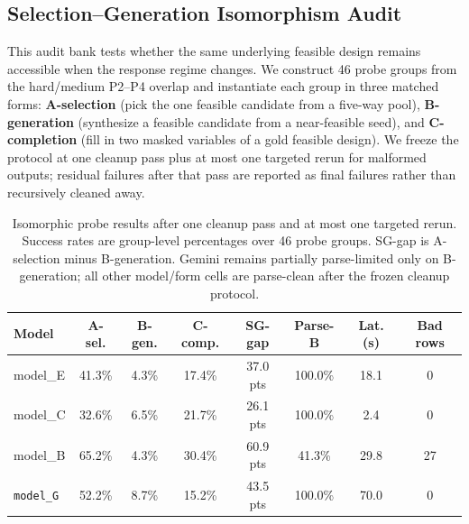 \subsection{Selection--Generation Isomorphism Audit}

This audit bank tests whether the same underlying feasible design remains accessible when the response regime changes. We construct 46 probe groups from the hard/medium P2--P4 overlap and instantiate each group in three matched forms: \textbf{A-selection} (pick the one feasible candidate from a five-way pool), \textbf{B-generation} (synthesize a feasible candidate from a near-feasible seed), and \textbf{C-completion} (fill in two masked variables of a gold feasible design). We freeze the protocol at one cleanup pass plus at most one targeted rerun for malformed outputs; residual failures after that pass are reported as final failures rather than recursively cleaned away.

\begin{table}[t]
\caption{Isomorphic probe results after one cleanup pass and at most one targeted rerun. Success rates are group-level percentages over 46 probe groups. SG-gap is A-selection minus B-generation. Gemini remains partially parse-limited only on B-generation; all other model/form cells are parse-clean after the frozen cleanup protocol.}
\label{tab:appendix_isomorphic_probe}
\centering
\scriptsize
\setlength{\tabcolsep}{3pt}
\renewcommand{\arraystretch}{1.08}
\begin{tabular}{p{30mm}ccccccc}
\toprule
Model & A-sel. & B-gen. & C-comp. & SG-gap & Parse-B & Lat. (s) & Bad rows \\
\midrule
model_E & 41.3\% & 4.3\% & 17.4\% & 37.0 pts & 100.0\% & 18.1 & 0 \\
model_C & 32.6\% & 6.5\% & 21.7\% & 26.1 pts & 100.0\% & 2.4 & 0 \\
model_B & 65.2\% & 4.3\% & 30.4\% & 60.9 pts & 41.3\% & 29.8 & 27 \\
\texttt{model_G} & 52.2\% & 8.7\% & 15.2\% & 43.5 pts & 100.0\% & 70.0 & 0 \\
\bottomrule
\end{tabular}
\end{table}


